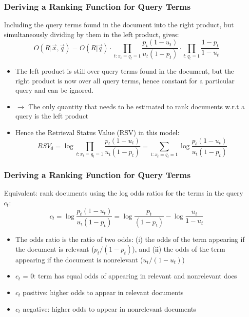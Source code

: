 \documentclass[compress]{beamer}
\def\myblue#1{\textcolor{texblue}{#1}}
\begin{document}
\begin{frame}[<+->]
\frametitle{Deriving a Ranking Function for Query Terms}
\pause[2]

Including the query terms found in the document into the right product, but simultaneously dividing  by them in the left product, gives:
\begin{equation}
\nonumber
O(R|\vec{x},\vec{q}) = O(R|\vec{q}) \cdot
\prod_{t: x_t = q_t =1}
\frac{p_t(1-u_t)}{u_t(1-p_t)} \cdot
\prod_{t: q_t=1}
\frac{1-p_t}{1-u_t}
\end{equation}

\begin{itemize}
\item The left product is still over query terms found in
  the document, but the right product is now over all query
  terms, hence constant for a particular query and can be
  ignored. 

\item $\rightarrow$ \myblue{The only quantity that needs to be estimated to rank documents w.r.t a query is the left product} 


\item Hence the \myblue{Retrieval Status Value} (RSV) in this model:
\begin{equation}
\nonumber
RSV_d = \log \prod_{t: x_t = q_t =1} \frac{p_t(1-u_t)}{u_t(1-p_t)} =
\sum_{t: x_t = q_t =1} \log \frac{p_t(1-u_t)}{u_t(1-p_t)}
\end{equation}
\end{itemize}
\end{frame}
\begin{frame}[<+->]
\frametitle{Deriving a Ranking Function for Query Terms}
\pause[2]

Equivalent: rank documents using the \myblue{log odds ratios} for the terms in the query $c_t$:
\begin{equation}
\nonumber
c_t = \log \frac{p_t(1-u_t)}{u_t(1-p_t)} = \log \frac{p_t}{(1-p_t)} - \log \frac{u_t}{1-u_t}
\end{equation}
\begin{itemize}

\item The \myblue{odds ratio} is the ratio of two odds: (i) the odds of the term appearing if the document is relevant ($p_t/(1-p_t)$), and (ii)
the odds of the term appearing if the document is nonrelevant ($u_t/(1-u_t)$) %

\item $c_t$ = 0: term has equal odds of
appearing in relevant and nonrelevant docs
\item $c_t$ positive: higher odds to appear in relevant
  documents
\item $c_t$ negative: higher odds to appear in nonrelevant
  documents
\end{itemize}
\end{frame}
\end{document}
